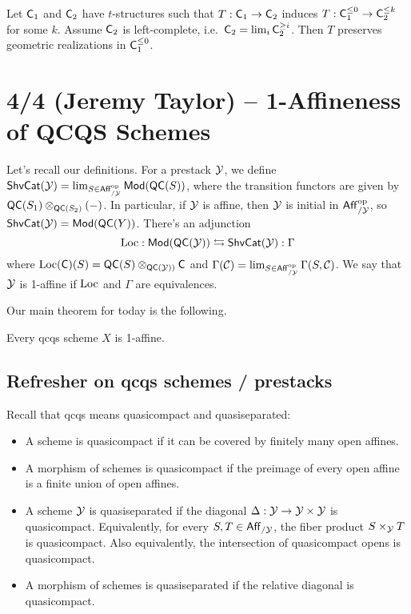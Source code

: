 \documentclass{article}
\begin{document}
\begin{thm}
	Let $\mathsf{C}_1$ and $\mathsf{C}_2$ have $t$-structures such that $T: \mathsf{C}_1 \to \mathsf{C}_2$ induces $T: \mathsf{C}_1^{\leq 0} \to \mathsf{C}_2^{\leq k}$ for some $k$.
	Assume $\mathsf{C}_2$ is left-complete, i.e.\ $\mathsf{C}_2 = \lim_i \mathsf{C}_2^{\geq i}$.
	Then $T$ preserves geometric realizations in $\mathsf{C}_1^{\leq 0}$.
\end{thm}

\section{4/4 (Jeremy Taylor) -- 1-Affineness of QCQS Schemes}

Let's recall our definitions.
For a prestack $\mathcal{Y}$, we define $\mathsf{ShvCat}(\mathcal{Y}) = \lim_{S \in \mathsf{Aff}_{/\mathcal{Y}}^{\mathrm{op}}} \mathsf{Mod}(\mathsf{QC}(S))$, where the transition functors are given by $\mathsf{QC}(S_1) \otimes_{\mathsf{QC}(S_2)} (-)$.
In particular, if $\mathcal{Y}$ is affine, then $\mathcal{Y}$ is initial in $\mathsf{Aff}_{/\mathcal{Y}}^{\mathrm{op}}$, so $\mathsf{ShvCat}(\mathcal{Y}) = \mathsf{Mod}(\mathsf{QC}(Y))$.
There's an adjunction
\[
	\operatorname{Loc}: \mathsf{Mod}(\mathsf{QC}(\mathcal{Y})) \leftrightarrows \mathsf{ShvCat}(\mathcal{Y}) :\Gamma
\]
where $\operatorname{Loc}(\mathsf{C})(S) = \mathsf{QC}(S) \otimes_{\mathsf{QC}(\mathcal{Y}))} \mathsf{C}$ and $\Gamma(\mathcal{C}) = \lim_{S \in \mathsf{Aff}_{/\mathcal{Y}}^{\mathrm{op}}} \Gamma(S, \mathcal{C})$.
We say that $\mathcal{Y}$ is 1-affine if $\operatorname{Loc}$ and $\Gamma$ are equivalences.

Our main theorem for today is the following.

\begin{thm}
	Every qcqs scheme $X$ is 1-affine.
\end{thm}

\subsection{Refresher on qcqs schemes / prestacks}

Recall that qcqs means quasicompact and quasiseparated:
\begin{itemize}
	\item A scheme is quasicompact if it can be covered by finitely many open affines.
	\item A morphism of schemes is quasicompact if the preimage of every open affine is a finite union of open affines.
	\item A scheme $\mathcal{Y}$ is quasiseparated if the diagonal $\Delta: \mathcal{Y} \to \mathcal{Y} \times \mathcal{Y}$ is quasicompact.
		Equivalently, for every $S, T \in \mathsf{Aff}_{/\mathcal{Y}}$, the fiber product $S \times_{\mathcal{Y}} T$ is quasicompact.
		Also equivalently, the intersection of quasicompact opens is quasicompact.
	\item A morphism of schemes is quasiseparated if the relative diagonal is quasicompact.
\end{itemize}
\end{document}
